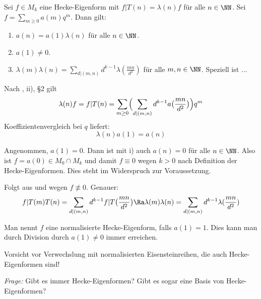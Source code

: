 \begin{satz}
Sei $f \in M_k$ eine Hecke-Eigenform mit $f | T(n) = \lambda (n)f$ für alle $n \in \NN$. Sei $f = \sum_{m \geq 0} a(m) q^m$. Dann gilt:
\begin{enumerate}
\item $a (n) = a(1) \lambda (n)$ für alle $n \in \NN$.
\item $a(1) \neq 0$.
\item $\lambda(m) \lambda(n) = \sum_{d \vert (m,n)} d^{k-1} \lambda(\frac {mn}{d^2})$ für alle $m,n \in \NN$. Speziell ist ...
\end{enumerate}
\end{satz}

\begin{bewe-list}
\item Nach , ii), §2 gilt
\[
\lambda(n) f = f | T(n) = \sum_{m \geq 0} \Bigl( \sum_{d \vert (m,n)} d^{k-1} a\bigl( \frac {mn}{d^2} \bigr) \Bigr) q^m
\]
Koeffizientenvergleich bei $q$ liefert:
\[
\lambda (n) a(1) = a(n)
\]
\item Angenommen, $a(1) = 0$. Dann ist mit i) auch $a(n) = 0$ für alle $n \in \NN$. Also ist $f = a(0) \in M_0 \cap M_k$ und damit $f \equiv 0$ wegen $k > 0$ nach Definition der Hecke-Eigenformen. Dies steht im Widerspruch zur Voraussetzung.
\item Folgt aus  und wegen $f \not \equiv 0$. Genauer:
\[
f | T(m) T(n) = \sum_{d \vert (m,n)} d^{k-1} f | T \bigl( \frac{mn}{d^2} \bigr) \Ra \lambda(m) \lambda(n) = \sum_{d \vert (m,n)} d^{k-1} \lambda(\frac {mn}{d^2})
\]
\end{bewe-list}

\begin{defi}
Man nennt $f$ eine normalisierte Hecke-Eigenform, falls $a(1) = 1$. Dies kann man durch Division durch $a(1) \neq 0$ immer erreichen.
\end{defi}

Vorsicht vor Verwechslung mit normalisierten Eisensteinreihen, die auch Hecke-Eigenformen sind!

\emph{Frage:} Gibt es immer Hecke-Eigenformen? Gibt es sogar eine Basis von Hecke-Eigenformen?

